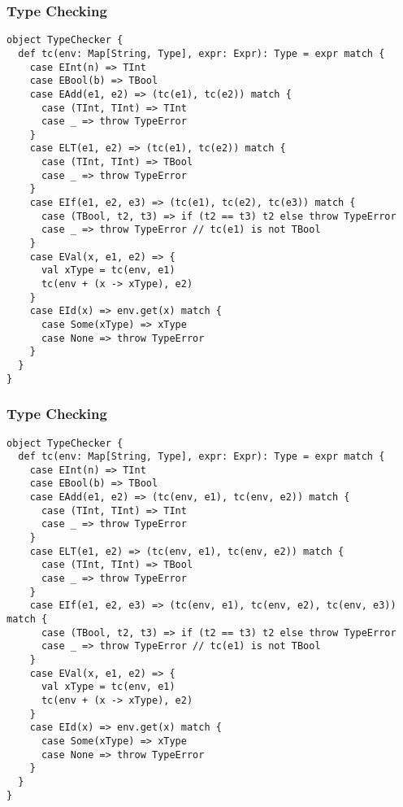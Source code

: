 \documentclass[8pt,pdf]{beamer}
\begin{document}
\begin{frame}[fragile]
\frametitle{Type Checking}

\begin{lstlisting}
object TypeChecker {
  def tc(env: Map[String, Type], expr: Expr): Type = expr match {
    case EInt(n) => TInt
    case EBool(b) => TBool
    case EAdd(e1, e2) => (tc(e1), tc(e2)) match {
      case (TInt, TInt) => TInt
      case _ => throw TypeError
    }
    case ELT(e1, e2) => (tc(e1), tc(e2)) match {
      case (TInt, TInt) => TBool
      case _ => throw TypeError
    }
    case EIf(e1, e2, e3) => (tc(e1), tc(e2), tc(e3)) match {
      case (TBool, t2, t3) => if (t2 == t3) t2 else throw TypeError
      case _ => throw TypeError // tc(e1) is not TBool
    }
    case EVal(x, e1, e2) => {
      val xType = tc(env, e1)
      tc(env + (x -> xType), e2)
    }
    case EId(x) => env.get(x) match {
      case Some(xType) => xType
      case None => throw TypeError
    }
  }
}
\end{lstlisting}
\end{frame}


\begin{frame}[fragile]
\frametitle{Type Checking}

\begin{lstlisting}
object TypeChecker {
  def tc(env: Map[String, Type], expr: Expr): Type = expr match {
    case EInt(n) => TInt
    case EBool(b) => TBool
    case EAdd(e1, e2) => (tc(env, e1), tc(env, e2)) match {
      case (TInt, TInt) => TInt
      case _ => throw TypeError
    }
    case ELT(e1, e2) => (tc(env, e1), tc(env, e2)) match {
      case (TInt, TInt) => TBool
      case _ => throw TypeError
    }
    case EIf(e1, e2, e3) => (tc(env, e1), tc(env, e2), tc(env, e3)) match {
      case (TBool, t2, t3) => if (t2 == t3) t2 else throw TypeError
      case _ => throw TypeError // tc(e1) is not TBool
    }
    case EVal(x, e1, e2) => {
      val xType = tc(env, e1)
      tc(env + (x -> xType), e2)
    }
    case EId(x) => env.get(x) match {
      case Some(xType) => xType
      case None => throw TypeError
    }
  }
}
\end{lstlisting}
\end{frame}
  
\end{document}
